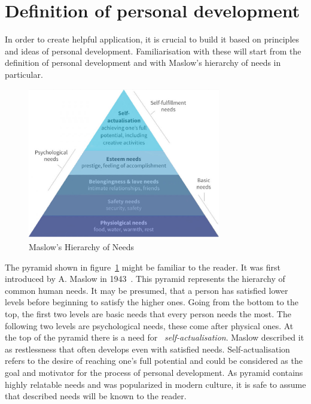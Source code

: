
\section{Definition of personal development}\label{sec:definition-of-personal-development}

In order to create helpful application, it is crucial to build it based on principles and ideas of personal development.
Familiarisation with these will start from the definition of personal development and with Maslow's hierarchy of needs in particular.

\begin{figure}[h]
    \includegraphics[width=0.75\textwidth]{images/maslows.jpg}
    \caption{Maslow's Hierarchy of Needs ~\cite{maslow-pyramid}}
    \label{fig:maslow-pyramid}
\end{figure}

The pyramid shown in figure~\ref{fig:maslow-pyramid} might be familiar to the reader.
It was first introduced by A. Maslow in 1943~\cite{maslow-motivation}.
This pyramid represents the hierarchy of common human needs.
It may be presumed, that a person has satisfied lower levels before beginning to satisfy the higher ones.
Going from the bottom to the top, the first two levels are basic needs that every person needs the most.
The following two levels are psychological needs, these come after physical ones.
At the top of the pyramid there is a need for ~\textit{self-actualisation}.
Maslow described it as restlessness that often develops even with satisfied needs.
Self-actualisation refers to the desire of reaching one's full potential and could be considered as the goal and motivator for the process of personal development.
As pyramid contains highly relatable needs and was popularized in modern culture, it is safe to assume that described needs will be known to the reader.

